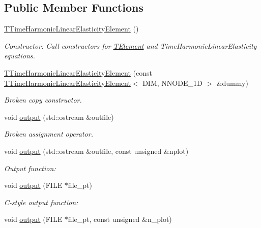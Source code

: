 \subsection*{Public Member Functions}
\begin{DoxyCompactItemize}
\item 
\hyperlink{classoomph_1_1TTimeHarmonicLinearElasticityElement_a28be2773ce1626dbae4d5222ebf599ad}{T\+Time\+Harmonic\+Linear\+Elasticity\+Element} ()
\begin{DoxyCompactList}\small\item\em Constructor\+: Call constructors for \hyperlink{classoomph_1_1TElement}{T\+Element} and Time\+Harmonic\+Linear\+Elasticity equations. \end{DoxyCompactList}\item 
\hyperlink{classoomph_1_1TTimeHarmonicLinearElasticityElement_a4078f42e6e4495e1985fcf3f142bedc1}{T\+Time\+Harmonic\+Linear\+Elasticity\+Element} (const \hyperlink{classoomph_1_1TTimeHarmonicLinearElasticityElement}{T\+Time\+Harmonic\+Linear\+Elasticity\+Element}$<$ D\+IM, N\+N\+O\+D\+E\+\_\+1D $>$ \&dummy)
\begin{DoxyCompactList}\small\item\em Broken copy constructor. \end{DoxyCompactList}\item 
void \hyperlink{classoomph_1_1TTimeHarmonicLinearElasticityElement_a5f20fab8c4740f48557380a36b86669b}{output} (std\+::ostream \&outfile)
\begin{DoxyCompactList}\small\item\em Broken assignment operator. \end{DoxyCompactList}\item 
void \hyperlink{classoomph_1_1TTimeHarmonicLinearElasticityElement_a6a11b59f4e32f9ce2bc7326dff35d8fb}{output} (std\+::ostream \&outfile, const unsigned \&nplot)
\begin{DoxyCompactList}\small\item\em Output function\+: \end{DoxyCompactList}\item 
void \hyperlink{classoomph_1_1TTimeHarmonicLinearElasticityElement_ac0124efd664afd05141495c072587d6a}{output} (F\+I\+LE $\ast$file\+\_\+pt)
\begin{DoxyCompactList}\small\item\em C-\/style output function\+: \end{DoxyCompactList}\item 
void \hyperlink{classoomph_1_1TTimeHarmonicLinearElasticityElement_af31e14a1ea8ce2e3a8a9ebd83403d566}{output} (F\+I\+LE $\ast$file\+\_\+pt, const unsigned \&n\+\_\+plot)

\end{DoxyCompactItemize}
